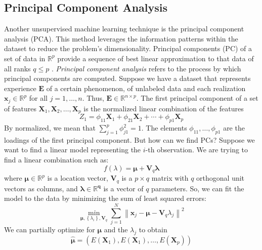 \subsection{Principal Component Analysis}
\label{subsec:PCA}
Another unsupervised machine learning technique is the principal component analysis (PCA). This method leverages the information patterns within the dataset to reduce the problem's dimensionality. Principal components (PC) of a set of data in $\mathbb{R}^p$ provide a sequence of best linear approximation to that data of all ranks $q\le p$ \cite{james_introduction_2021, tibshirani_elements_2008}. \emph{Principal component analysis} refers to the process by which principal components are computed. Suppose we have a dataset that represents experience $\mathbf{E}$ of a certain phenomenon, of unlabeled data and each realization $\mathbf{x}_j \in \mathbb{R}^p$ for all $j=1,\dots,n$. Thus, $\mathbf{E} \in \mathbb{R}^{n\times p}$. The first principal component of a set of features $\mathbf{X}_1, \mathbf{X}_2, \dots, \mathbf{X}_p$ is the normalized linear combination of the features
\begin{equation}
    \label{eq:firstPC}
    Z_1=\phi_{11} \mathbf{X}_1+\phi_{21} \mathbf{X}_2+\cdots+\phi_{p1} \mathbf{X}_p
\end{equation}
By normalized, we mean that $\sum_{j=1}^p\phi_{j1}^2=1$. The elements $\phi_{11},\dots,\phi_{p1}$ are the loadings of the first principal component. But how can we find PCs? Suppose we want to find a linear model representing the $i$-th observation. We are trying to find a linear combination such as:
\begin{equation}
    \label{eq:pcaf}
    f(\lambda)=\bm{\mu}+\mathbf{V}_q\bm{\lambda}
\end{equation}
where $\bm{\mu}\in \mathbb{R}^p$ is a location vector, $\mathbf{V}_q$ is a $p\times q$ matrix with $q$ orthogonal unit vectors as columns, and $\bm{\lambda \in \mathbb{R}^q}$ is a vector of $q$ parameters. So, we can fit the model to the data by minimizing the sum of least squared errors:
\begin{equation}
    \label{eq:SSE}
    \min _{\bm{\mu},\left\{\lambda_i\right\}, \mathbf{V}_q} \sum_{j=1}^N\left\|\mathbf{x}_j-\bm{\mu}-\mathbf{V}_q \lambda_j\right\|^2
\end{equation}
We can partially optimize for $\bm{\mu}$ and the $\lambda_j$ to obtain
\begin{equation}
    \hat{\bm{\mu}} = \left(E\left(\mathbf{X}_1\right), E\left(\mathbf{X}_1\right), \dots, E\left(\mathbf{X}_p\right)\right)
\end{equation}

